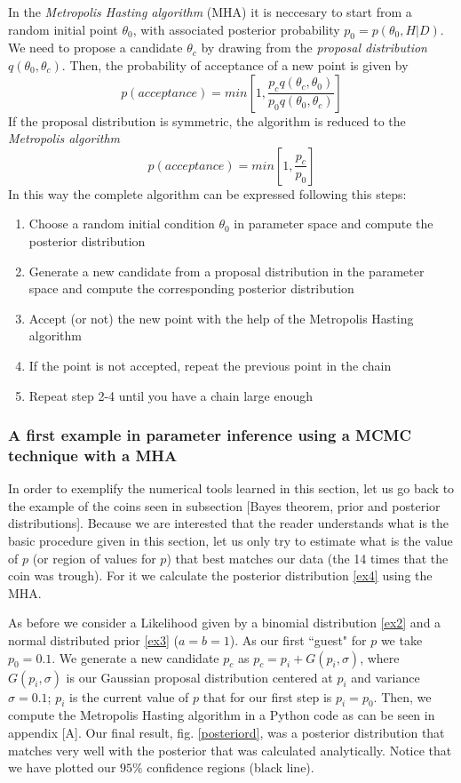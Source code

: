 \documentclass[onecolumn,           %
               showpacs,            %
               preprintnumbers,     %
               aps,                 %
               prl,          	    %
               letterpaper,             %
               superscriptaddress,      %
               nofootinbib,         %
               tightenlines,        %
               floats,floatfix      %
               ,usenatbib,
               ]{revtex4-1}
\begin{document}
In the \textit{Metropolis Hasting algorithm} (MHA) \cite{metr} it is neccesary to start from a random initial point $\theta_0$, with associated posterior probability $p_0=p(\theta_0,H|D)$. We need to propose a candidate $\theta_c$ by drawing from the \textit{proposal distribution} $q(\theta_0,\theta_c)$. Then, the probability of acceptance of a new point is given by
\begin{equation}
p(acceptance)=min\left[1,\frac{p_cq(\theta_c,\theta_0)}{p_0q(\theta_0,\theta_c)}\right]
\end{equation}
If the proposal distribution is symmetric, the algorithm is reduced to the \textit{Metropolis algorithm}
  \begin{equation}
  p(acceptance)=min\left[1,\frac{p_c}{p_0}\right]
  \end{equation}
In this way the complete algorithm can be expressed following this steps:
\begin{enumerate}
\item Choose a random initial condition $\theta_0$ in parameter space and compute the posterior distribution
\item Generate a new candidate from a proposal distribution in the parameter space and compute the corresponding posterior distribution
\item Accept (or not) the new point with the help of the Metropolis Hasting algorithm
\item If the point is not accepted, repeat the previous point in the chain
\item Repeat step 2-4 until you have a chain large enough
\end{enumerate}

\subsubsection{A first example in parameter inference using a MCMC technique with a MHA}

In order to exemplify the numerical tools learned in this section, let us 
go back to the example of the coins seen in subsection [Bayes theorem, prior and posterior distributions]. Because we are interested that the reader understands what is the basic procedure given in this section, let us only try to estimate what is the value of $p$ (or region of values for $p$) that best matches our data (the 14 times that the coin was trough). For it we calculate the posterior distribution \eqref{ex4} using the MHA. 

As before we consider a Likelihood given by a binomial distribution \eqref{ex2} and a normal distributed prior \eqref{ex3} ($a=b=1$). As our first ``guest" for $p$ we take $p_0=0.1$. We generate a new candidate $p_c$ as $p_c=p_i+G(p_i,\sigma)$, where $G(p_i,\sigma)$ is our Gaussian proposal distribution centered at $p_i$ and variance $\sigma=0.1$; $p_i$ is the current value of $p$ that for our first step is $p_i=p_0$. Then, we compute the Metropolis Hasting algorithm in a Python code as can be seen in appendix [A]. Our final result,  fig. \ref{posteriord}, was a posterior distribution that matches very well with the posterior that was calculated analytically. Notice that we have plotted our $95\%$ confidence regions (black line). 
\end{document}
